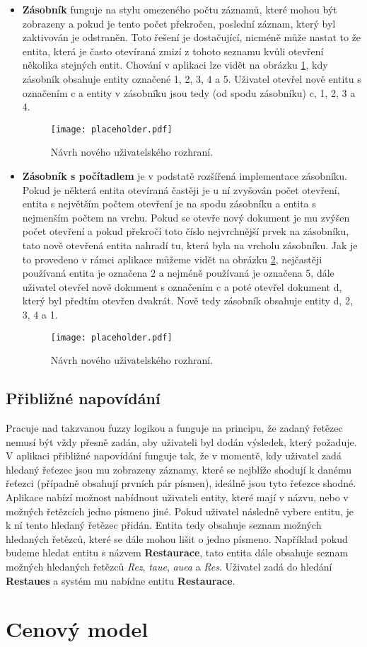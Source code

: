 \begin{itemize}
  \item \textbf{Zásobník} funguje na stylu omezeného počtu záznamů, které mohou být zobrazeny a pokud je tento počet překročen, poslední záznam, který byl zaktivován je odstraněn. Toto řešení je dostačující, nicméně může nastat to že entita, která je často otevíraná zmizí z tohoto seznamu kvůli otevření několika stejných entit. Chování v aplikaci lze vidět na obrázku \ref{zasobnik}, kdy zásobník obsahuje entity označené 1, 2, 3, 4 a 5. Uživatel otevřel nově entitu s označením c a entity v zásobníku jsou tedy (od spodu zásobníku) c, 1, 2, 3 a 4.
\begin{figure}[htp]
  \centering
  \texttt{[image: placeholder.pdf]}
  \caption{Návrh nového uživatelského rozhraní.}
  \label{zasobnik}
\end{figure}
  \item \textbf{Zásobník s počítadlem} je v podstatě rozšířená implementace zásobníku. Pokud je některá entita otevíraná častěji je u ní zvyšován počet otevření, entita s největším počtem otevření je na spodu zásobníku a entita s nejmenším počtem na vrchu. Pokud se otevře nový dokument je mu zvýšen počet otevření a pokud překročí toto číslo nejvrchnější prvek na zásobníku, tato nově otevřená entita nahradí tu, která byla na vrcholu zásobníku. Jak je to provedeno v rámci aplikace můžeme vidět na obrázku \ref{counter}, nejčastěji používaná entita je označena 2 a nejméně používaná je označena 5, dále uživatel otevřel nově dokument s označením c a poté otevřel dokument d, který byl předtím otevřen dvakrát. Nově tedy zásobník obsahuje entity d, 2, 3, 4 a 1.
\begin{figure}[htp]
  \centering
  \texttt{[image: placeholder.pdf]}
  \caption{Návrh nového uživatelského rozhraní.}
  \label{counter}
\end{figure}
\end{itemize}

\subsection{Přibližné napovídání}
\par Pracuje nad takzvanou fuzzy logikou a funguje na principu, že zadaný řetězec nemusí být vždy přesně zadán, aby uživateli byl dodán výsledek, který požaduje. V aplikaci přibližné napovídání funguje tak, že v momentě, kdy uživatel zadá hledaný řeťezec jsou mu zobrazeny záznamy, které se nejblíže shodují k danému řeťezci (případně obsahují prvních pár písmen), ideálně jsou tyto řeťezce shodné. Aplikace nabízí možnost nabídnout uživateli entity, které mají v názvu, nebo v možných řetězcích jedno písmeno jiné. Pokud uživatel následně vybere entitu, je k ní tento hledaný řetězec přidán. Entita tedy obsahuje seznam možných hledaných řetězců, které se dále mohou lišit o jedno písmeno. Například pokud budeme hledat entitu s názvem \textbf{Restaurace}, tato entita dále obsahuje seznam možných hledaných řetězců \textit{Rez}, \textit{taue}, \textit{auea} a \textit{Res}. Uživatel zadá do hledání \textbf{Restaues} a systém mu nabídne entitu \textbf{Restaurace}.

\section{Cenový model}